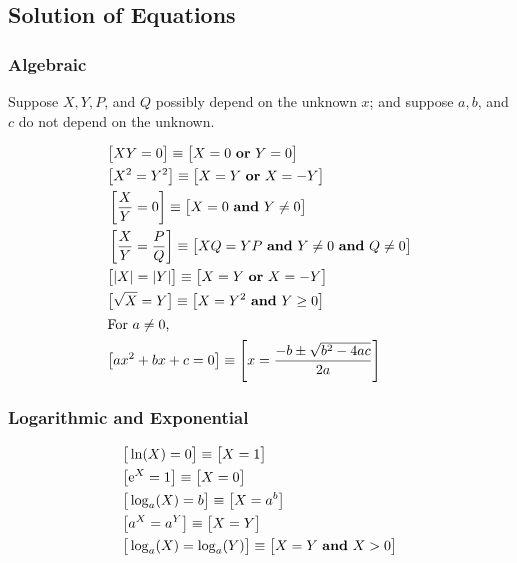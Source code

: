 \documentclass[letterpaper,landscape,9pt,fleqn]{extarticle}
\newcommand{\euler}{\mathrm{e}}
\begin{document}
\begin{multicols*}{3}
\section*{Solution of Equations}

\subsubsection*{Algebraic}
Suppose $X, Y, P$, and $Q$ possibly  depend on the unknown $x$; and
suppose $a,b$, and $c$ do not depend on the unknown. 
\begin{minipage}[c]{0.3333333333333\textwidth}
\begin{align*}
& \big [X Y = 0 \big ] \equiv \big [ X = 0 \mbox{ \textbf{or} } Y = 0 \big ]\\
& \big [ X^2 = Y^2 \big ] \equiv \big [ X = Y \mbox{ \textbf{or} } X = -Y \big ]\\
&\left [ \frac{X}{Y} = 0 \right ] \equiv \big [ X = 0 \mbox{ \textbf{and} } Y \neq 0 \big ] \\
&\left [\frac{X}{Y} = \frac{P}{Q}  \right ] \equiv \big [X Q = Y P  \mbox{ \textbf{and}  } Y \neq 0  \mbox{ \textbf{and}  }  Q \neq 0 \big ] \\
&\big [|X| = |Y|  \big ] \equiv \big [X = Y \mbox{ \textbf{or} } X = -Y \big ]\\
&\big [ \sqrt{X}  = Y \big ] \equiv \big [X = Y^2 \mbox{ \textbf{and}  } Y \ge 0 \big ] \\
\intertext{For \(a \neq 0\),}
& \big [a x^2 + b x + c = 0 \big] \equiv \left [x = \frac{-b \pm \sqrt{b^2 - 4 a c}}{2 a} \right] \\
\end{align*}
\end{minipage}
\begin{minipage}[c]{0.3333333333333\textwidth}
\subsubsection*{Logarithmic and Exponential}
\begin{align*}
& \big [\ln(X) = 0 \big] \equiv \big [X =  1\big] \\
& \big [\euler^X = 1 \big] \equiv \big [X = 0 \big] \\
& \big [\log_a(X) = b \big] \equiv \big [X = a^b \big] \\
& \big [a^X = a^Y \big] \equiv \big [X = Y \big] \\
& \big [\log_a(X) = \log_a(Y) \big] \equiv \big [X = Y \mbox{  \textbf{and} } X > 0 \big] 
\end{align*}
\end{minipage}

\end{multicols*}
\end{document}

